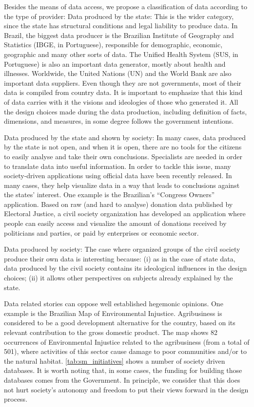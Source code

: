 Besides the means of data access, we propose a classification of data according to the type of provider:
Data produced by the state: This is the wider category, since the state has structural conditions and legal liability to produce data. In Brazil, the biggest data producer is the Brazilian Institute of Geography and Statistics (IBGE, in Portuguese), responsible for demographic, economic, geographic and many other sorts of data. The Unified Health System (SUS, in Portuguese) is also an important data generator, mostly about health and illnesses. Worldwide, the United Nations (UN) and the World Bank are also important data suppliers. Even though they are not governments, most of their data is compiled from country data. It is important to emphasize that this kind of data carries with it the visions and ideologies of those who generated it. All the design choices made during the data production, including definition of facts, dimensions, and measures, in some degree follows the government intentions.

Data produced by the state and shown by society: In many cases, data produced by the state is not open, and when it is open, there are no tools for the citizens to easily analyse and take their own conclusions. Specialists are needed in order to translate data into useful information. In order to tackle this issue, many society-driven applications using official data have been recently released. In many cases, they help visualize data in a way that leads to conclusions against the states' interest. One example is the Brazilian's “Congress Owners” application. Based on raw (and hard to analyse) donation data published by Electoral Justice, a civil society organization has developed an application where people can easily access and visualize the amount of donations received by politicians and parties, or paid by enterprises or economic sector. 

Data produced by society: The case where organized groups of the civil society produce their own data is interesting because: (i) as in the case of state data, data produced by the civil society contains its ideological influences in the design choices; (ii) it allows other perspectives on subjects already explained by the state. 

Data related stories can oppose well established hegemonic opinions. One example is the Brazilian Map of Environmental Injustice. Agribusiness is considered to be a good development alternative for the country, based on its relevant contribution to the gross domestic product. The map shows 82 occurrences of Environmental Injustice related to the agribusiness (from a total of 501), where activities of this sector cause damage to poor communities and/or to the natural habitat. \autoref{tab:sm_initiatives} shows a number of society driven databases. It is worth noting that, in some cases, the funding for building those databases comes from the Government. In principle, we consider that this does not hurt society’s autonomy and freedom to put their views forward in the design process.


